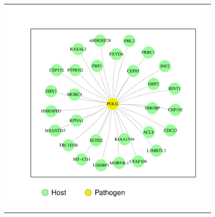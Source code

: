 \documentclass{bioinfo}
\begin{document}
\begin{figure}
\begin{tabular}{c}
\begin{minipage}{\textwidth}
\begin{center}
\includegraphics[scale=0.33, trim = 0.2 0.2 0.2 0.2]{flavinet.pdf}
\end{center}
\end{minipage}
\\
\begin{minipage}{\textwidth}
\begin{center}

\end{center}
\end{minipage}
\end{tabular}
\end{figure}
\end{document}
